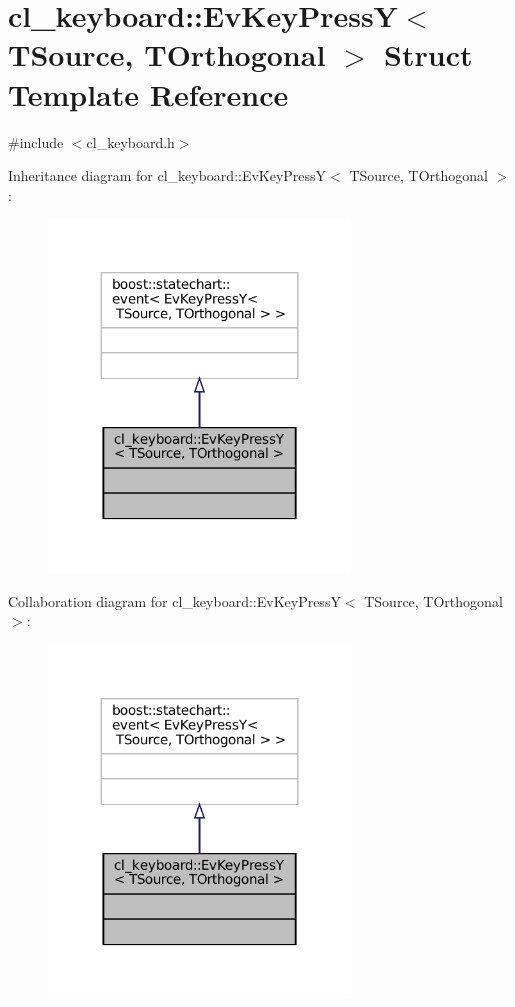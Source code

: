 \hypertarget{structcl__keyboard_1_1EvKeyPressY}{}\section{cl\+\_\+keyboard\+:\+:Ev\+Key\+PressY$<$ T\+Source, T\+Orthogonal $>$ Struct Template Reference}
\label{structcl__keyboard_1_1EvKeyPressY}


{\ttfamily \#include $<$cl\+\_\+keyboard.\+h$>$}



Inheritance diagram for cl\+\_\+keyboard\+:\+:Ev\+Key\+PressY$<$ T\+Source, T\+Orthogonal $>$\+:
\nopagebreak
\begin{figure}[H]
\begin{center}
\leavevmode
\includegraphics[width=227pt]{structcl__keyboard_1_1EvKeyPressY__inherit__graph}
\end{center}
\end{figure}


Collaboration diagram for cl\+\_\+keyboard\+:\+:Ev\+Key\+PressY$<$ T\+Source, T\+Orthogonal $>$\+:
\nopagebreak
\begin{figure}[H]
\begin{center}
\leavevmode
\includegraphics[width=227pt]{structcl__keyboard_1_1EvKeyPressY__coll__graph}
\end{center}
\end{figure}


